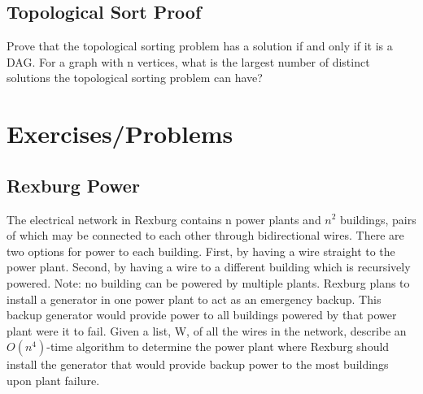 \documentclass[12pt]{amsart}
\begin{document}
\subsection{Topological Sort Proof}

Prove that the topological sorting problem has a solution if and only if it is a DAG. For a graph with n vertices, what is the largest number of distinct solutions the topological sorting problem can have? 



\section{Exercises/Problems}

\subsection{Rexburg Power} 
The electrical network in Rexburg contains n power plants and $n^2$ buildings, pairs of which may be connected to each other through bidirectional wires. There are two options for power to each building. First, by having a wire straight to the power plant. Second, by having a wire to a different building which is recursively powered. Note: no building can be powered by multiple plants. Rexburg plans to install a generator in one power plant to act as an emergency backup. This backup generator would provide power to all buildings powered by that power plant were it to fail.  Given a list, W, of all the wires in the network, describe an $O(n^4)$-time algorithm to determine the power plant where Rexburg should install the generator that would provide backup power to the most buildings upon plant failure. 
\\
\end{document}
